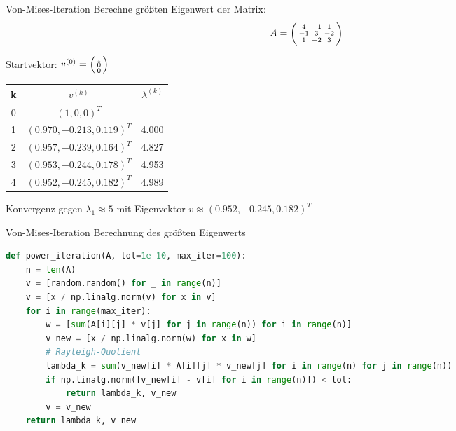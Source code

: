 \begin{example2}{Von-Mises-Iteration}
Berechne größten Eigenwert der Matrix:
$$A = \begin{psmallmatrix}
4 & -1 & 1\\
-1 & 3 & -2\\
1 & -2 & 3
\end{psmallmatrix}$$

Startvektor: $v^{(0)} = \begin{psmallmatrix}1\\ 0\\ 0\end{psmallmatrix}$

\begin{center}
\begin{tabular}{c|c|c}
k & $v^{(k)}$ & $\lambda^{(k)}$ \\\hline
0 & $(1, 0, 0)^T$ & -\\
1 & $(0.970, -0.213, 0.119)^T$ & 4.000\\
2 & $(0.957, -0.239, 0.164)^T$ & 4.827\\
3 & $(0.953, -0.244, 0.178)^T$ & 4.953\\
4 & $(0.952, -0.245, 0.182)^T$ & 4.989
\end{tabular}
\end{center}

Konvergenz gegen $\lambda_1 \approx 5$ mit Eigenvektor $v \approx (0.952, -0.245, 0.182)^T$
\end{example2}

\begin{examplecode}{Von-Mises-Iteration} Berechnung des größten Eigenwerts
\begin{lstlisting}[language=Python, style=basesmol]
def power_iteration(A, tol=1e-10, max_iter=100):
    n = len(A)
    v = [random.random() for _ in range(n)]
    v = [x / np.linalg.norm(v) for x in v]
    for i in range(max_iter):
        w = [sum(A[i][j] * v[j] for j in range(n)) for i in range(n)]
        v_new = [x / np.linalg.norm(w) for x in w]
        # Rayleigh-Quotient
        lambda_k = sum(v_new[i] * A[i][j] * v_new[j] for i in range(n) for j in range(n))
        if np.linalg.norm([v_new[i] - v[i] for i in range(n)]) < tol:
            return lambda_k, v_new
        v = v_new
    return lambda_k, v_new
\end{lstlisting}
\end{examplecode}

